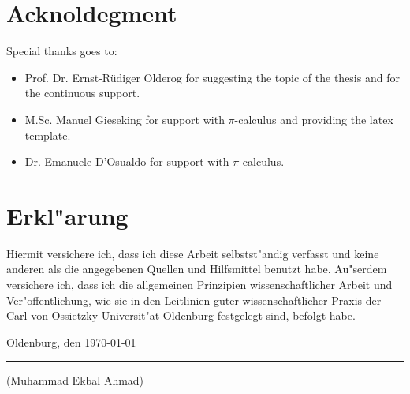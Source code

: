	\section*{Acknoldegment}
	Special thanks goes to:
	\begin{itemize}
	\item Prof. Dr. Ernst-Rüdiger Olderog for suggesting the topic of the thesis and for the continuous support.
	\item M.Sc. Manuel Gieseking for support with $\pi$-calculus and providing the latex template.
	\item Dr. Emanuele D'Osualdo for support with $\pi$-calculus.
	\end{itemize}
	\section*{Erkl"arung}
	Hiermit versichere ich, dass ich diese Arbeit selbstst"andig verfasst und keine anderen als die angegebenen Quellen und Hilfsmittel benutzt habe. Au"serdem versichere ich, dass ich die allgemeinen Prinzipien wissenschaftlicher Arbeit und Ver"offentlichung, wie sie in den Leitlinien guter wissenschaftlicher Praxis der Carl von Ossietzky Universit"at Oldenburg festgelegt sind, befolgt habe.
	
	\vspace{1cm}
	Oldenburg, den \today
	
	\vspace{0.5cm}
	\rule{6cm}{0.5pt}
	
	(Muhammad Ekbal Ahmad)

